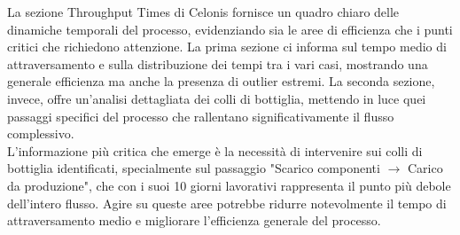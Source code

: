 \documentclass{article}
\begin{document}
La sezione Throughput Times di Celonis fornisce un quadro chiaro delle dinamiche temporali del processo, evidenziando sia le aree di efficienza che i punti critici che richiedono attenzione. La prima sezione ci informa sul tempo medio di attraversamento e sulla distribuzione dei tempi tra i vari casi, mostrando una generale efficienza ma anche la presenza di outlier estremi. La seconda sezione, invece, offre un'analisi dettagliata dei colli di bottiglia, mettendo in luce quei passaggi specifici del processo che rallentano significativamente il flusso complessivo.\\
L'informazione più critica che emerge è la necessità di intervenire sui colli di bottiglia identificati, specialmente sul passaggio "Scarico componenti $\rightarrow$ Carico da produzione", che con i suoi 10 giorni lavorativi rappresenta il punto più debole dell'intero flusso. Agire su queste aree potrebbe ridurre notevolmente il tempo di attraversamento medio e migliorare l'efficienza generale del processo.
\end{document}
